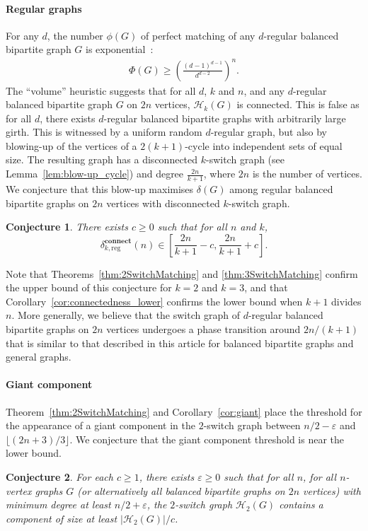\documentclass[11pt,a4paper]{article}
\newtheorem{conjecture}{Conjecture}[section]
\theoremstyle{definition}
\newcommand{\eps}{\varepsilon}
\begin{document}
\paragraph{Regular graphs}
For any $d$, the number $\phi(G)$ of perfect matching of any $d$-regular balanced
bipartite graph $G$ is exponential~\cite{Sch98,Voo79,Gur08,Csi17}:
\begin{align*}
  \Phi(G) \ge \left(\frac{(d-1)^{d-1}}{d^{d-2}}\right)^n.
\end{align*}
The ``volume'' heuristic suggests that for all $d$, $k$ and $n$, and any
$d$-regular balanced bipartite graph $G$ on $2n$ vertices, $\mathcal H_k(G)$ is
connected. This is false as for all $d$, there exists $d$-regular balanced
bipartite graphs with arbitrarily large girth. This is witnessed by a uniform
random $d$-regular graph, but also by blowing-up of the vertices of a
$2(k+1)$-cycle into independent sets of equal size. The resulting graph has a
disconnected $k$-switch graph (see Lemma~\ref{lem:blow-up_cycle}) and degree
$\frac{2n}{k+1}$, where $2n$ is the number of vertices.  We conjecture that this
blow-up maximises $\delta(G)$ among regular balanced bipartite graphs on $2n$
vertices with disconnected $k$-switch graph.
\begin{conjecture}
  There exists $c \ge 0$ such that for all $n$ and $k$,
  $$\delta^{\mathbf{connect}}_{k,\mathrm{reg}}(n) \in \left[ \frac{2n}{k+1} -c, \frac{2n}{k+1} +c\right].$$
\end{conjecture}
Note that Theorems~\ref{thm:2SwitchMatching} and \ref{thm:3SwitchMatching} confirm the
upper bound of this conjecture for $k=2$ and $k = 3$, and that
Corollary~\ref{cor:connectedness_lower} confirms the lower bound when $k+1$ divides
$n$. More generally, we believe that the switch graph of $d$-regular balanced
bipartite graphs on $2n$ vertices undergoes a phase transition around $2n/(k+1)$
that is similar to that described in this article for balanced bipartite graphs
and general graphs.

\paragraph{Giant component}
Theorem~\ref{thm:2SwitchMatching} and Corollary~\ref{cor:giant} place the threshold for the
appearance of a giant component in the $2$-switch graph between $n/2 - \eps$ and
$\lfloor (2n + 3)/3 \rfloor$. We conjecture that the giant
component threshold is near the lower bound.
\begin{conjecture}\label{conj:giant}
  For each $c \ge 1$, there exists $\eps \ge 0$ such that for all $n$, for all
  $n$-vertex graphs $G$ (or alternatively all balanced bipartite graphs on $2n$
  vertices) with minimum degree at least $n/2 + \eps$, the $2$-switch graph
  $\mathcal H_2(G)$ contains a component of size at least $|\mathcal H_2(G)|/c$.
\end{conjecture}
\end{document}
